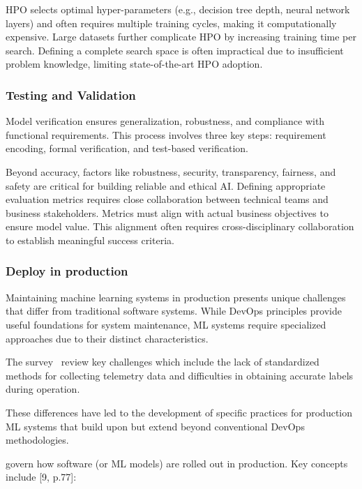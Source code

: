 HPO selects optimal hyper-parameters (e.g., decision tree depth, neural network layers) and often requires multiple training cycles, making it computationally expensive.
Large datasets further complicate HPO by increasing training time per search\cite{10.1145/3533378}.
Defining a complete search space is often impractical due to insufficient problem knowledge, limiting state-of-the-art HPO adoption.

\subsubsection{Testing and Validation}
Model verification ensures generalization, robustness, and compliance with functional requirements.
This process involves three key steps: requirement encoding, formal verification, and test-based verification\cite{10.1145/3533378}.

Beyond accuracy, factors like robustness, security, transparency, fairness, and safety are critical for building reliable and ethical AI\cite{10.1145/3555803}.
Defining appropriate evaluation metrics requires close collaboration between technical teams and business stakeholders\cite{10.1145/3533378}.
Metrics must align with actual business objectives to ensure model value.
This alignment often requires cross-disciplinary collaboration to establish meaningful success criteria.

\subsubsection{Deploy in production}
Maintaining machine learning systems in production presents unique challenges that differ from traditional software systems.
While DevOps principles provide useful foundations for system maintenance, ML systems require specialized approaches due to their distinct characteristics\cite{10.1145/3533378}.

The survey~\cite{10.1145/3533378} review key challenges which include the lack of standardized methods for collecting telemetry data and difficulties in obtaining accurate labels during operation.

These differences have led to the development of specific practices for production ML systems that build upon but extend beyond conventional DevOps methodologies\cite{gift2021practical,10.1145/3533378}.


\label{subsec:deployment-strategies}
govern how software (or ML models) are rolled out in production.
Key concepts include [9, p.77]:


